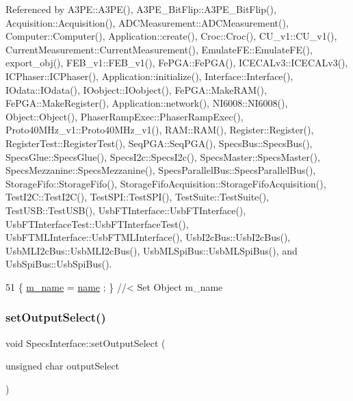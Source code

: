 Referenced by A3\+P\+E\+::\+A3\+P\+E(), A3\+P\+E\+\_\+\+Bit\+Flip\+::\+A3\+P\+E\+\_\+\+Bit\+Flip(), Acquisition\+::\+Acquisition(), A\+D\+C\+Measurement\+::\+A\+D\+C\+Measurement(), Computer\+::\+Computer(), Application\+::create(), Croc\+::\+Croc(), C\+U\+\_\+v1\+::\+C\+U\+\_\+v1(), Current\+Measurement\+::\+Current\+Measurement(), Emulate\+F\+E\+::\+Emulate\+F\+E(), export\+\_\+obj(), F\+E\+B\+\_\+v1\+::\+F\+E\+B\+\_\+v1(), Fe\+P\+G\+A\+::\+Fe\+P\+G\+A(), I\+C\+E\+C\+A\+Lv3\+::\+I\+C\+E\+C\+A\+Lv3(), I\+C\+Phaser\+::\+I\+C\+Phaser(), Application\+::initialize(), Interface\+::\+Interface(), I\+Odata\+::\+I\+Odata(), I\+Oobject\+::\+I\+Oobject(), Fe\+P\+G\+A\+::\+Make\+R\+A\+M(), Fe\+P\+G\+A\+::\+Make\+Register(), Application\+::network(), N\+I6008\+::\+N\+I6008(), Object\+::\+Object(), Phaser\+Ramp\+Exec\+::\+Phaser\+Ramp\+Exec(), Proto40\+M\+Hz\+\_\+v1\+::\+Proto40\+M\+Hz\+\_\+v1(), R\+A\+M\+::\+R\+A\+M(), Register\+::\+Register(), Register\+Test\+::\+Register\+Test(), Seq\+P\+G\+A\+::\+Seq\+P\+G\+A(), Specs\+Bus\+::\+Specs\+Bus(), Specs\+Glue\+::\+Specs\+Glue(), Specs\+I2c\+::\+Specs\+I2c(), Specs\+Master\+::\+Specs\+Master(), Specs\+Mezzanine\+::\+Specs\+Mezzanine(), Specs\+Parallel\+Bus\+::\+Specs\+Parallel\+Bus(), Storage\+Fifo\+::\+Storage\+Fifo(), Storage\+Fifo\+Acquisition\+::\+Storage\+Fifo\+Acquisition(), Test\+I2\+C\+::\+Test\+I2\+C(), Test\+S\+P\+I\+::\+Test\+S\+P\+I(), Test\+Suite\+::\+Test\+Suite(), Test\+U\+S\+B\+::\+Test\+U\+S\+B(), Usb\+F\+T\+Interface\+::\+Usb\+F\+T\+Interface(), Usb\+F\+T\+Interface\+Test\+::\+Usb\+F\+T\+Interface\+Test(), Usb\+F\+T\+M\+L\+Interface\+::\+Usb\+F\+T\+M\+L\+Interface(), Usb\+I2c\+Bus\+::\+Usb\+I2c\+Bus(), Usb\+M\+L\+I2c\+Bus\+::\+Usb\+M\+L\+I2c\+Bus(), Usb\+M\+L\+Spi\+Bus\+::\+Usb\+M\+L\+Spi\+Bus(), and Usb\+Spi\+Bus\+::\+Usb\+Spi\+Bus().


\begin{DoxyCode}
51 \{ \hyperlink{classObject_a8b83c95c705d2c3ba0d081fe1710f48d}{m\_name}  = \hyperlink{classObject_a300f4c05dd468c7bb8b3c968868443c1}{name}  ; \} \textcolor{comment}{//< Set Object m\_name}
\end{DoxyCode}
\mbox{\label{classSpecsInterface_a1907d360f2bda367cfb1d39e379c6493}} 
\subsubsection{\texorpdfstring{set\+Output\+Select()}{setOutputSelect()}}
{\footnotesize\ttfamily void Specs\+Interface\+::set\+Output\+Select (\begin{DoxyParamCaption}\item[{unsigned char}]{output\+Select }\end{DoxyParamCaption})\hspace{0.3cm}{\ttfamily [inherited]}}



